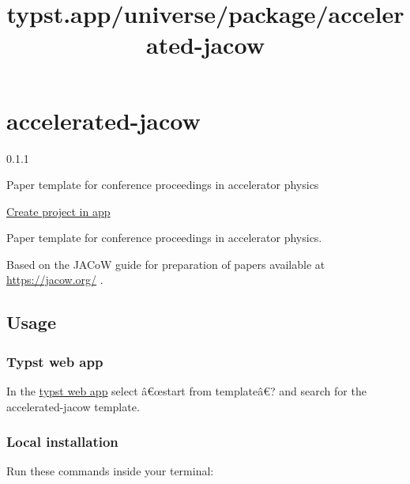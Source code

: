 \title{typst.app/universe/package/accelerated-jacow}

\label{banner}
\label{template-thumbnail}

\section{accelerated-jacow}\label{accelerated-jacow}

{ 0.1.1 }

Paper template for conference proceedings in accelerator physics

\href{/app?template=accelerated-jacow&version=0.1.1}{Create project in
app}

\label{readme}
\href{https://github.com/eltos/accelerated-jacow}{}
\href{https://typst.app/universe/package/accelerated-jacow}{}

Paper template for conference proceedings in accelerator physics.

Based on the JACoW guide for preparation of papers available at
\url{https://jacow.org/} .

\subsection{Usage}\label{usage}

\subsubsection{Typst web app}\label{typst-web-app}

In the \href{https://typst.app/}{typst web app} select â€œstart from
templateâ€? and search for the accelerated-jacow template.

\subsubsection{Local installation}\label{local-installation}

Run these commands inside your terminal:

\begin{Shaded}
\begin{Highlighting}[]
\end{Highlighting}
\end{Shaded}

